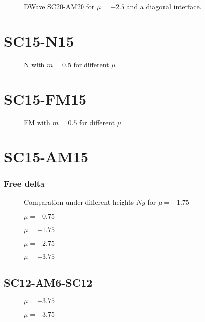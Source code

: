 \documentclass[../main.tex]{subfiles}
\begin{document}
\begin{figure}[H]
    
    \caption{DWave SC20-AM20 for $\mu=-2.5$ and a diagonal interface.}
\end{figure}

\section{SC15-N15}
\begin{figure}[H]
    
    \caption{N with $m=0.5$ for different $\mu$}
\end{figure}
\section{SC15-FM15}
\begin{figure}[H]
    
    \caption{FM with $m=0.5$ for different $\mu$}
\end{figure}
\section{SC15-AM15}

\subsubsection{Free delta}
\begin{figure}[H]
    
    \caption{Comparation under different heights $Ny$ for $\mu = -1.75$}
\end{figure}
\begin{figure}[H]
    
    \caption{$\mu = -0.75$}
\end{figure}
\begin{figure}[H]
    
    \caption{$\mu = -1.75$}
\end{figure}
\begin{figure}[H]
    
    \caption{$\mu = -2.75$}
\end{figure}
\begin{figure}[H]
    
    \caption{$\mu = -3.75$}
\end{figure}

\subsection{SC12-AM6-SC12}
\begin{figure}[H]
    
    \caption{$\mu = -3.75$}
\end{figure}
\begin{figure}[H]
    
    \caption{$\mu = -3.75$}
\end{figure}
\end{document}
